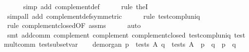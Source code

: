 \begin{isabellebody}
%
\isadelimproof
\ \ \ \ %
\endisadelimproof
%
\isatagproof
{}\isamarkupfalse%
\ {}simp\ add{}\ complement{}def{}\isanewline
\ \ \ \ \isamarkupfalse%
\ {}rule\ the{}I{}{}\isanewline
\ \ \ \ \isamarkupfalse%
\ {}simp{}all\ add{}\ complement{}def{}symmetric{}{}\isanewline
\ \ \ \ \isamarkupfalse%
\ {}rule\ test{}compl{}uniq{}\isanewline
\ \ \ \ \isamarkupfalse%
\ {}rule\ complement{}closed{}OF\ assms{}{}\isanewline
\ \ \ \ \isamarkupfalse%
\ auto\isanewline
\ \ \ \ \isamarkupfalse%
\ {}smt\ add{}comm\ complement{}\ complement{}\ complement{}closed\ test{}compl{}uniq\ test{}mult{}comm\ test{}subset{}var{}%
\endisatagproof
{\isafoldproof}%
%
\isadelimproof
\isanewline
%
\endisadelimproof
\isanewline
\ \ \isamarkupfalse%
\ de{}morgan{}{}\ {}{}p\ {}\ tests\ A{}\ q\ {}\ tests\ A{}\ {}\ {}p\ {}\ {}q\ {}\ {}{}p\ {}\ q{}{}\isanewline

\end{isabellebody}

